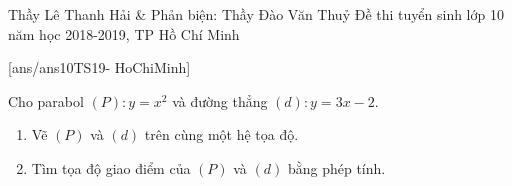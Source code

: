 \begin{name}
	{Thầy Lê Thanh Hải \& Phản biện: Thầy Đào Văn Thuỷ}
	{Đề thi tuyển sinh lớp 10 năm học 2018-2019, TP Hồ Chí Minh }
\end{name}
\setcounter{ex}{0}
[ans/ans10TS19- HoChiMinh]
\begin{ex}%
	Cho parabol $ (P)\colon y =x^2 $ và đường thẳng $(d)\colon y  =3x-2$.
	\begin{enumerate}
		\item Vẽ $ (P) $ và $ (d) $ trên cùng một hệ tọa độ.
		\item Tìm tọa độ giao điểm của $ (P) $ và $ (d) $ bằng phép tính.
	\end{enumerate}
\end{ex}
